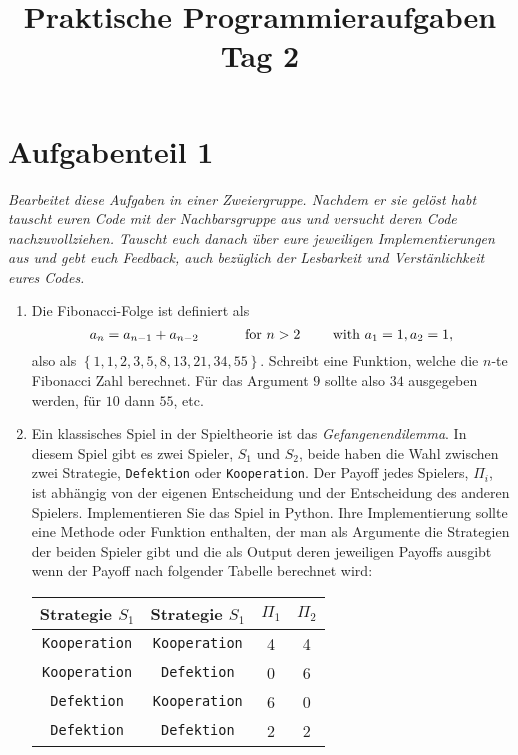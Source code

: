 \documentclass[11pt]{article}
\begin{document}
\title{Praktische Programmieraufgaben\\Tag 2}
\date{ }
\maketitle

\section*{Aufgabenteil 1}

\textit{Bearbeitet diese Aufgaben in einer Zweiergruppe. Nachdem er sie gelöst habt tauscht euren Code mit der Nachbarsgruppe aus und versucht deren Code nachzuvollziehen. Tauscht euch danach über eure jeweiligen Implementierungen aus und gebt euch Feedback, auch bezüglich der Lesbarkeit und Verstänlichkeit eures Codes.}

\begin{enumerate}
  \item Die Fibonacci-Folge ist definiert als 
  $$a_n = a_{n-1} + a_{n-2} \quad\quad\quad \textup{ for } n>2 \quad\quad \textup{ with } a_1=1, a_2=1,$$
  also als $\left\{1, 1, 2, 3, 5, 8, 13, 21, 34, 55\right\}$.
  Schreibt eine Funktion, welche die $n$-te Fibonacci Zahl berechnet. Für das Argument $9$ sollte also $34$ ausgegeben werden, für $10$ dann $55$, etc.
  \item Ein klassisches Spiel in der Spieltheorie ist das \textit{Gefangenendilemma}. In diesem Spiel gibt es zwei Spieler, $S_1$ und $S_2$, beide haben die Wahl zwischen zwei Strategie, \texttt{Defektion} oder \texttt{Kooperation}. Der Payoff jedes Spielers, $\Pi_i$, ist abhängig von der eigenen Entscheidung und der Entscheidung des anderen Spielers. Implementieren Sie das Spiel in Python. Ihre Implementierung sollte eine Methode oder Funktion enthalten, der man als Argumente die Strategien der beiden Spieler gibt und die als Output deren jeweiligen Payoffs ausgibt wenn der Payoff nach folgender Tabelle berechnet wird:
\begin{center}
	  \begin{tabular}{cccc}
  \toprule
  	\textbf{Strategie $S_1$} & \textbf{Strategie $S_1$} & $\Pi_1$ & $\Pi_2$\\
  	\midrule
  		\texttt{Kooperation} & \texttt{Kooperation} & 4 & 4 \\
  		\texttt{Kooperation} & \texttt{Defektion} & 0 & 6\\
  		\texttt{Defektion} & \texttt{Kooperation} & 6 & 0 \\
  		\texttt{Defektion} & \texttt{Defektion} & 2 & 2\\
  		\bottomrule
  \end{tabular}
\end{center}
\end{enumerate}
\end{document}
